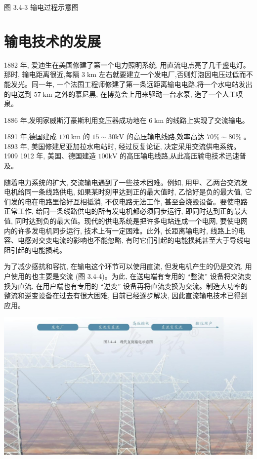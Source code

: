 \documentclass[10pt]{article}
\begin{document}
图 3.4-3 输电过程示意图

\section*{输电技术的发展}

1882 年, 爱迪生在美国修建了第一个电力照明系统, 用直流电点亮了几千盏电灯。那时, 输电距离很近,每隔 \(3\mathrm{\;{km}}\) 左右就要建立一个发电厂,否则灯泡因电压过低而不能发光。同一年, 一个法国工程师修建了第一条远距离输电电路,将一个水电站发出的电送到 \({57}\mathrm{\;{km}}\) 之外的慕尼黑, 在博览会上用来驱动一台水泵, 造了一个人工喷泉。

1886 年,发明家威斯汀豪斯利用变压器成功地在 \(6\mathrm{\;{km}}\) 的线路上实现了交流输电。

1891 年,德国建成 \({170}\mathrm{\;{km}}\) 的 \({15} \sim {30}\mathrm{{kV}}\) 的高压输电线路,效率高达 \({70}\% \sim {80}\%\) 。1893 年, 美国修建尼亚加拉水电站时, 经过反复论证, 决定采用交流供电系统。1909 1912 年, 美国、德国建造 \({100}\mathrm{{kV}}\) 的高压输电线路,从此高压输电技术迅速普及。

随着电力系统的扩大, 交流输电遇到了一些技术困难。例如, 用甲、乙两台交流发电机给同一条线路供电, 如果某时刻甲达到正的最大值时, 乙恰好是负的最大值, 它们发的电在电路里恰好互相抵消, 不仅电路无法工作, 甚至会烧毁设备。要使电路正常工作, 给同一条线路供电的所有发电机都必须同步运行, 即同时达到正的最大值, 同时达到负的最大值。现代的供电系统是把许多电站连成一个电网, 要使电网内的许多发电机同步运行, 技术上有一定困难。此外, 长距离输电时, 线路上的电容、电感对交变电流的影响也不能忽略, 有时它们引起的电能损耗甚至大于导线电阻引起的电能损耗。

为了减少感抗和容抗, 在输电这个环节可以使用直流, 但发电机产生的仍是交流, 用户使用的也主要是交流 (图 3.4-4)。为此, 在送电端有专用的 “整流” 设备将交流变换为直流, 在用户端也有专用的 “逆变” 设备再将直流变换为交流。制造大功率的整流和逆变设备在过去有很大困难, 目前已经逐步解决, 因此直流输电技术已得到应用。

\begin{center}
\includegraphics[max width=1.0\textwidth]{images/01910e72-c5b7-7ed5-a6d4-fb3a5faefc32_71_814602.jpg}
\end{center}
\end{document}
